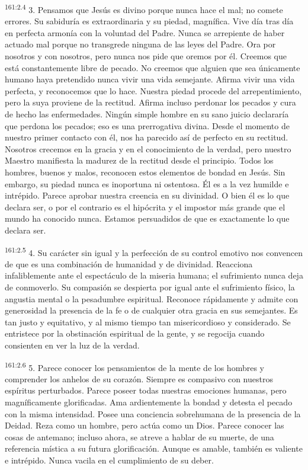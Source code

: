 \par
\textsuperscript{161:2.4} 3. Pensamos que Jesús es divino porque nunca hace el mal; no comete errores. Su sabiduría es extraordinaria y su piedad, magnífica. Vive día tras día en perfecta armonía con la voluntad del Padre. Nunca se arrepiente de haber actuado mal porque no transgrede ninguna de las leyes del Padre. Ora por nosotros y con nosotros, pero nunca nos pide que oremos por él. Creemos que está constantemente libre de pecado. No creemos que alguien que sea únicamente humano haya pretendido nunca vivir una vida semejante. Afirma vivir una vida perfecta, y reconocemos que lo hace. Nuestra piedad procede del arrepentimiento, pero la suya proviene de la rectitud. Afirma incluso perdonar los pecados y cura de hecho las enfermedades. Ningún simple hombre en su sano juicio declararía que perdona los pecados; eso es una prerrogativa divina. Desde el momento de nuestro primer contacto con él, nos ha parecido así de perfecto en su rectitud. Nosotros crecemos en la gracia y en el conocimiento de la verdad, pero nuestro Maestro manifiesta la madurez de la rectitud desde el principio. Todos los hombres, buenos y malos, reconocen estos elementos de bondad en Jesús. Sin embargo, su piedad nunca es inoportuna ni ostentosa. Él es a la vez humilde e intrépido. Parece aprobar nuestra creencia en su divinidad. O bien él es lo que declara ser, o por el contrario es el hipócrita y el impostor más grande que el mundo ha conocido nunca. Estamos persuadidos de que es exactamente lo que declara ser.

\par
\textsuperscript{161:2.5} 4. Su carácter sin igual y la perfección de su control emotivo nos convencen de que es una combinación de humanidad y de divinidad. Reacciona infaliblemente ante el espectáculo de la miseria humana; el sufrimiento nunca deja de conmoverlo. Su compasión se despierta por igual ante el sufrimiento físico, la angustia mental o la pesadumbre espiritual. Reconoce rápidamente y admite con generosidad la presencia de la fe o de cualquier otra gracia en sus semejantes. Es tan justo y equitativo, y al mismo tiempo tan misericordioso y considerado. Se entristece por la obstinación espiritual de la gente, y se regocija cuando consienten en ver la luz de la verdad.

\par
\textsuperscript{161:2.6} 5. Parece conocer los pensamientos de la mente de los hombres y comprender los anhelos de su corazón. Siempre es compasivo con nuestros espíritus perturbados. Parece poseer todas nuestras emociones humanas, pero magníficamente glorificadas. Ama ardientemente la bondad y detesta el pecado con la misma intensidad. Posee una conciencia sobrehumana de la presencia de la Deidad. Reza como un hombre, pero actúa como un Dios. Parece conocer las cosas de antemano; incluso ahora, se atreve a hablar de su muerte, de una referencia mística a su futura glorificación. Aunque es amable, también es valiente e intrépido. Nunca vacila en el cumplimiento de su deber.

